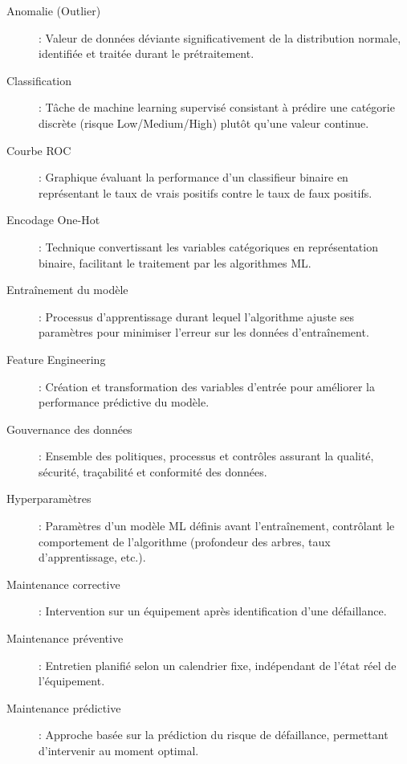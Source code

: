 \documentclass[a4paper,12pt]{report}
\begin{document}
\vspace{2cm}

\begin{description}
\item[Anomalie (Outlier)] : Valeur de données déviante significativement de la distribution normale, identifiée et traitée durant le prétraitement.

\item[Classification] : Tâche de machine learning supervisé consistant à prédire une catégorie discrète (risque Low/Medium/High) plutôt qu'une valeur continue.

\item[Courbe ROC] : Graphique évaluant la performance d'un classifieur binaire en représentant le taux de vrais positifs contre le taux de faux positifs.

\item[Encodage One-Hot] : Technique convertissant les variables catégoriques en représentation binaire, facilitant le traitement par les algorithmes ML.

\item[Entraînement du modèle] : Processus d'apprentissage durant lequel l'algorithme ajuste ses paramètres pour minimiser l'erreur sur les données d'entraînement.

\item[Feature Engineering] : Création et transformation des variables d'entrée pour améliorer la performance prédictive du modèle.

\item[Gouvernance des données] : Ensemble des politiques, processus et contrôles assurant la qualité, sécurité, traçabilité et conformité des données.

\item[Hyperparamètres] : Paramètres d'un modèle ML définis avant l'entraînement, contrôlant le comportement de l'algorithme (profondeur des arbres, taux d'apprentissage, etc.).

\item[Maintenance corrective] : Intervention sur un équipement après identification d'une défaillance.

\item[Maintenance préventive] : Entretien planifié selon un calendrier fixe, indépendant de l'état réel de l'équipement.

\item[Maintenance prédictive] : Approche basée sur la prédiction du risque de défaillance, permettant d'intervenir au moment optimal.


\end{description}
\end{document}
